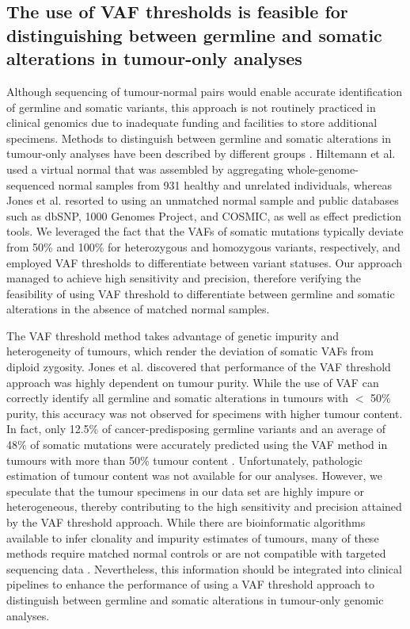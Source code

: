 \subsection{The use of VAF thresholds is feasible for distinguishing between germline and somatic alterations in tumour-only analyses}

Although sequencing of tumour-normal pairs would enable accurate identification of germline and somatic variants, this approach is not routinely practiced in clinical genomics due to inadequate funding and facilities to store additional specimens. Methods to distinguish between germline and somatic alterations in tumour-only analyses have been described by different groups \cite{Hiltemann2015, Jones2015a, Garofalo2016}. Hiltemann et al. \cite{Hiltemann2015} used a virtual normal that was assembled by aggregating whole-genome-sequenced normal samples from 931 healthy and unrelated individuals, whereas Jones et al. \cite{Jones2015a} resorted to using an unmatched normal sample and public databases such as dbSNP, 1000 Genomes Project, and COSMIC, as well as effect prediction tools. We leveraged the fact that the VAFs of somatic mutations typically deviate from 50\% and 100\% for heterozygous and homozygous variants, respectively, and employed VAF thresholds to differentiate between variant statuses. Our approach managed to achieve high sensitivity and precision, therefore verifying the feasibility of using VAF threshold to differentiate between germline and somatic alterations in the absence of matched normal samples.

The VAF threshold method takes advantage of genetic impurity and heterogeneity of tumours, which render the deviation of somatic VAFs from diploid zygosity. Jones et al. \cite{Jones2015a} discovered that performance of the VAF threshold approach was highly dependent on tumour purity. While the use of VAF can correctly identify all germline and somatic alterations in tumours with $<$ 50\% purity, this accuracy was not observed for specimens with higher tumour content. In fact, only 12.5\% of cancer-predisposing germline variants and an average of 48\% of somatic mutations were accurately predicted using the VAF method in tumours with more than 50\% tumour content \cite{Jones2015a}. Unfortunately, pathologic estimation of tumour content was not available for our analyses. However, we speculate that the tumour specimens in our data set are highly impure or heterogeneous, thereby contributing to the high sensitivity and precision attained by the VAF threshold approach. While there are bioinformatic algorithms available to infer clonality and impurity estimates of tumours, many of these methods require matched normal controls or are not compatible with targeted sequencing data \cite{Yadav2015}. Nevertheless, this information should be integrated into clinical pipelines to enhance the performance of using a VAF threshold approach to distinguish between germline and somatic alterations in tumour-only genomic analyses.

